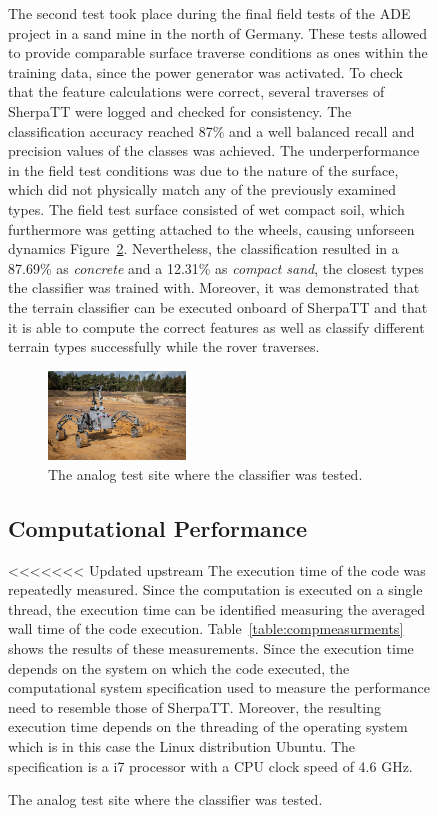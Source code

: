 \documentclass{article}
\begin{document}
\begin{figure}[!htb]
The second test took place during the final field tests of the ADE project \cite{ocon2021} in a sand mine in the north of Germany.
These tests allowed to provide comparable surface traverse conditions as ones within the training data, since the power generator was activated.
To check that the feature calculations were correct, several traverses of SherpaTT were logged and checked for consistency. 
The classification accuracy reached 87\% and a well balanced recall and precision values of the classes was achieved. 
The underperformance in the field test conditions was due to the nature of the surface, which did not physically match any of the previously examined types. 
The field test surface consisted of wet compact soil, which furthermore was getting attached to the wheels, causing unforseen dynamics Figure~\ref{fig:finaltest}.
Nevertheless, the classification resulted in a 87.69\% as \emph{concrete} and a 12.31\% as \emph{compact sand}, the closest types the classifier was trained with.
Moreover, it was demonstrated that the terrain classifier can be executed onboard of SherpaTT and that it is able to compute the correct features as well as classify different terrain types successfully while the rover traverses.

\begin{figure}[!htb]
    \centering
        \includegraphics[width=0.4\textwidth]{../figures/sandmine_v2.jpg}
    \caption{The analog test site where the classifier was tested.}
    \label{fig:finaltest}
\end{figure}


\subsection{Computational Performance}

<<<<<<< Updated upstream
The execution time of the code was repeatedly measured. Since the computation is executed on a single thread, the execution time can be identified measuring the averaged wall time of the code execution. Table~\ref{table:compmeasurments} shows the results of these measurements. Since the execution time depends on the system on which the code executed, the computational system specification used to measure the performance need to resemble those of SherpaTT. Moreover, the resulting execution time depends
on the threading of the operating system which is in this case the Linux distribution Ubuntu. The specification is a i7 processor with a CPU clock speed of 4.6 GHz. 


\end{figure}
\end{document}
